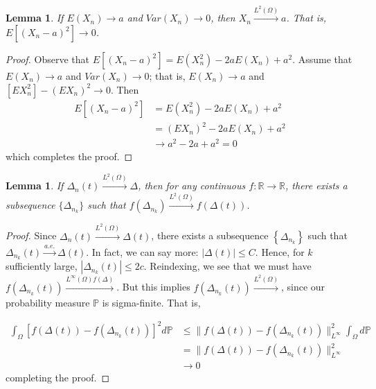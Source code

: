 \documentclass[12pt,reqno]{amsart}
\numberwithin{equation}{section}  %
\newcommand{\rr}{\mathbb{R}}
\newtheorem{lemma}[theorem]{Lemma}
\begin{document}
\begin{lemma}
If $E(X_{n}) \to a$ and $Var(X_{n}) \to 0$, then $X_{n} \xrightarrow{L^{2}(\Omega)}a$. That is, \\ $E[(X_{n} -a)^{2}] \to 0$.
\label{lem:}
\end{lemma}

\begin{proof}
Observe that $E[(X_{n}- a )^{2}] = E(X_{n}^{2}) - 2aE(X_{n}) + a^{2}$. Assume that $E(X_{n}) \to a$ and $Var(X_{n}) \to 0$; that is, $E(X_{n}) \to a$ and $[EX_{n}^{2}] - (E X_{n})^{2} \to 0$. Then
\begin{equation*}
\begin{split}
  E[(X_{n} - a)^{2}] & = E(X_{n}^{2}) - 2aE(X_{n}) + a^{2}
  \\
  & = (EX_{n})^{2} - 2a E(X_{n}) + a^{2}
  \\
  & \to a^{2} - 2a +  a^{2} = 0 
\end{split}
\end{equation*}
which completes the proof.
\end{proof}

\begin{lemma}
If $\Delta_{n}(t) \xrightarrow{L^{2}(\Omega)} \Delta$, then for any continuous $f: \rr \to \rr$, there exists a subsequence $\{ \Delta_{n_{k}} \}$ such that $f(\Delta_{n_{k}}) \xrightarrow{L^{2}(\Omega)} f(\Delta(t))$.
\label{lem:}
\end{lemma}
\begin{proof}
Since $\Delta_{n}(t) \xrightarrow{L^{2}(\Omega)} \Delta(t)$, there exists a subsequence $\left \{ \Delta_{n_{k}} \right \}$ such that $\Delta_{n_{k}}(t) \xrightarrow{a.e.} \Delta(t)$. In fact, we can say more: $| \Delta(t) | \le C$. Hence, for $k$ sufficiently large, $| \Delta_{n_{k}}(t) | \le 2c$. Reindexing, we see that we must have $f(\Delta_{n_{k}}(t)) \xrightarrow{L^{\infty}(\Omega) f(\Delta)}$. But this implies $f(\Delta_{n_{k}}(t)) \xrightarrow{L^{2}(\Omega)}$, since our probability measure $\mathbb{P}$ is sigma-finite. That is,

\begin{equation*}
\begin{split}
  \int_{\Omega} [f(\Delta(t)) - f(\Delta_{n_{k}}(t))]^{2} d \mathbb{P} 
  & \le \| f(\Delta(t)) - f(\Delta_{n_{k}}(t)) \|^{2}_{L^{\infty}} \int_{\Omega} d \mathbb{P}
  \\
  & =  \| f(\Delta(t)) - f(\Delta_{n_{k}}(t)) \|^{2}_{L^{\infty}}
  \\
  & \to 0
\end{split}
\end{equation*}
completing the proof.
\end{proof}
\end{document}
